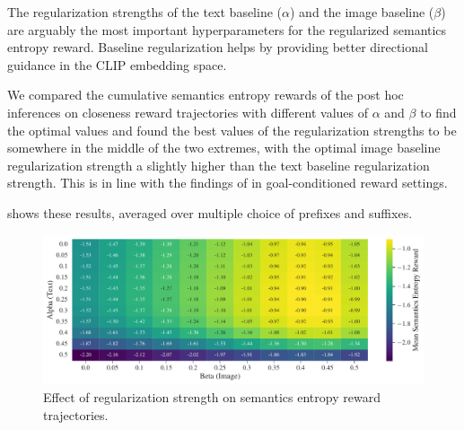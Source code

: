 The regularization strengths of the text baseline (\(\alpha\)) and the image baseline (\(\beta\)) are arguably the most important hyperparameters for the regularized semantics entropy reward.
Baseline regularization helps by providing better directional guidance in the CLIP embedding space.

We compared the cumulative semantics entropy rewards of the post hoc inferences on closeness reward trajectories with different values of \(\alpha\) and \(\beta\) to find the optimal values and found the best values of the regularization strengths to be somewhere in the middle of the two extremes, with the optimal image baseline regularization strength a slightly higher than the text baseline regularization strength.
This is in line with the findings of \cite{vlmrm} in goal-conditioned reward settings.

 shows these results, averaged over multiple choice of prefixes and suffixes.

\begin{figure}[H]
    \centering
    \includegraphics[width=\textwidth]{images/alpha_beta_temp12avg_noneg.pdf}
    \caption{Effect of regularization strength on semantics entropy reward trajectories.}
    \label{fig:clip-alpha-beta}
\end{figure}




